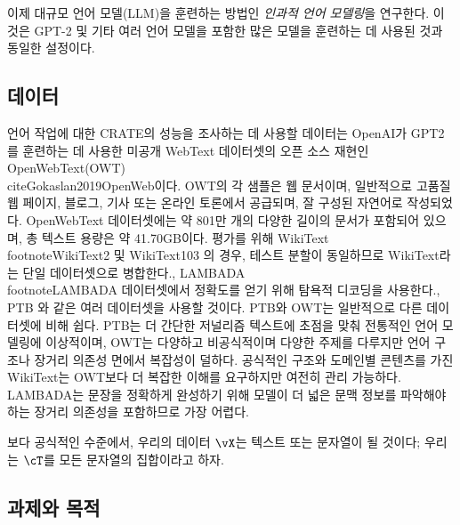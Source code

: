 \documentclass[../../book-main_ko.tex]{subfiles}
\begin{document}
이제 대규모 언어 모델(LLM)을 훈련하는 방법인 \textit{인과적 언어 모델링}을 연구한다. 이것은 GPT-2 및 기타 여러 언어 모델을 포함한 많은 모델을 훈련하는 데 사용된 것과 동일한 설정이다.

\subsection{데이터} \label{sub:clm_text_data}

언어 작업에 대한 CRATE의 성능을 조사하는 데 사용할 데이터는 OpenAI가 GPT2를 훈련하는 데 사용한 미공개 WebText 데이터셋의 오픈 소스 재현인 OpenWebText(OWT)\\cite{Gokaslan2019OpenWeb}이다. OWT의 각 샘플은 웹 문서이며, 일반적으로 고품질 웹 페이지, 블로그, 기사 또는 온라인 토론에서 공급되며, 잘 구성된 자연어로 작성되었다. OpenWebText 데이터셋에는 약 801만 개의 다양한 길이의 문서가 포함되어 있으며, 총 텍스트 용량은 약 41.70GB이다. 평가를 위해 WikiText \cite{merity2016pointer}\\footnote{WikiText2 및 WikiText103 \cite{merity2016pointer}의 경우, 테스트 분할이 동일하므로 WikiText라는 단일 데이터셋으로 병합한다.}, LAMBADA \cite{paperno2016lambadadatasetwordprediction}\\footnote{LAMBADA 데이터셋에서 정확도를 얻기 위해 탐욕적 디코딩을 사용한다.}, PTB \cite{marcus-etal-1993-building}와 같은 여러 데이터셋을 사용할 것이다. PTB와 OWT는 일반적으로 다른 데이터셋에 비해 쉽다. PTB는 더 간단한 저널리즘 텍스트에 초점을 맞춰 전통적인 언어 모델링에 이상적이며, OWT는 다양하고 비공식적이며 다양한 주제를 다루지만 언어 구조나 장거리 의존성 면에서 복잡성이 덜하다. 공식적인 구조와 도메인별 콘텐츠를 가진 WikiText는 OWT보다 더 복잡한 이해를 요구하지만 여전히 관리 가능하다. LAMBADA는 문장을 정확하게 완성하기 위해 모델이 더 넓은 문맥 정보를 파악해야 하는 장거리 의존성을 포함하므로 가장 어렵다.

보다 공식적인 수준에서, 우리의 데이터 \(\vX\)는 텍스트 또는 문자열이 될 것이다; 우리는 \(\cT\)를 모든 문자열의 집합이라고 하자.

\subsection{과제와 목적} \label{sub:clm_text_objective}
\end{document}
